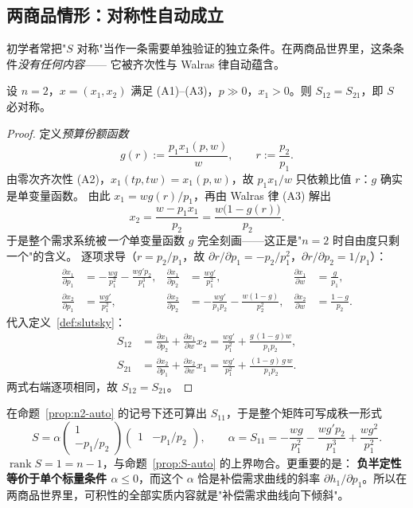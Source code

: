 \subsection{两商品情形：对称性自动成立}

初学者常把"$S$ 对称"当作一条需要单独验证的独立条件。在两商品世界里，这条条件\emph{没有任何内容}——
它被齐次性与 Walras 律自动蕴含。

\begin{proposition}[$n=2$ 时对称性自动成立]\label{prop:n2-auto}
设 $n=2$，$x=(x_1,x_2)$ 满足 (A1)--(A3)，$p\gg0$，$x_1>0$。则 $S_{12}=S_{21}$，即 $S$ 必对称。
\end{proposition}

\begin{proof}
定义\emph{预算份额函数}
\[
 g(r):=\frac{p_1x_1(p,w)}{w},\qquad r:=\frac{p_2}{p_1}.
\]
由零次齐次性 (A2)，$x_1(tp,tw)=x_1(p,w)$，故 $p_1x_1/w$ 只依赖比值 $r$：$g$ 确实是单变量函数。
由此 $x_1=wg(r)/p_1$，再由 Walras 律 (A3) 解出
\[
 x_2=\frac{w-p_1x_1}{p_2}=\frac{w\bigl(1-g(r)\bigr)}{p_2}.
\]
于是整个需求系统被\emph{一个}单变量函数 $g$ 完全刻画——这正是"$n=2$ 时自由度只剩一个"的含义。
逐项求导（$r=p_2/p_1$，故 $\partial r/\partial p_1=-p_2/p_1^2$，$\partial r/\partial p_2=1/p_1$）：
\begin{align*}
\frac{\partial x_1}{\partial p_1}&=-\frac{wg}{p_1^2}-\frac{wg'p_2}{p_1^3},&
\frac{\partial x_1}{\partial p_2}&=\frac{wg'}{p_1^2},&
\frac{\partial x_1}{\partial w}&=\frac{g}{p_1},\\
\frac{\partial x_2}{\partial p_1}&=\frac{wg'}{p_1^2},&
\frac{\partial x_2}{\partial p_2}&=-\frac{wg'}{p_1p_2}-\frac{w(1-g)}{p_2^2},&
\frac{\partial x_2}{\partial w}&=\frac{1-g}{p_2}.
\end{align*}
代入定义~\ref{def:slutsky}：
\begin{align*}
S_{12}&=\frac{\partial x_1}{\partial p_2}+\frac{\partial x_1}{\partial w}x_2
 =\frac{wg'}{p_1^2}+\frac{g\,(1-g)w}{p_1p_2},\\
S_{21}&=\frac{\partial x_2}{\partial p_1}+\frac{\partial x_2}{\partial w}x_1
 =\frac{wg'}{p_1^2}+\frac{(1-g)\,g\,w}{p_1p_2}.
\end{align*}
两式右端逐项相同，故 $S_{12}=S_{21}$。
\end{proof}

\begin{remark}[$n=2$ 时的显式结构]
在命题~\ref{prop:n2-auto} 的记号下还可算出 $S_{11}$，于是整个矩阵可写成秩一形式
\[
 S=\alpha\begin{pmatrix}1\\[1pt] -p_1/p_2\end{pmatrix}
   \begin{pmatrix}1 & -p_1/p_2\end{pmatrix},
 \qquad
 \alpha=S_{11}=-\frac{wg}{p_1^2}-\frac{wg'p_2}{p_1^3}+\frac{wg^2}{p_1^2}.
\]
$\operatorname{rank}S=1=n-1$，与命题~\ref{prop:S-auto} 的上界吻合。更重要的是：
\textbf{负半定性等价于单个标量条件 $\alpha\le0$}，而这个 $\alpha$ 恰是补偿需求曲线的斜率
$\partial h_1/\partial p_1$。所以在两商品世界里，可积性的全部实质内容就是"补偿需求曲线向下倾斜"。
\end{remark}

